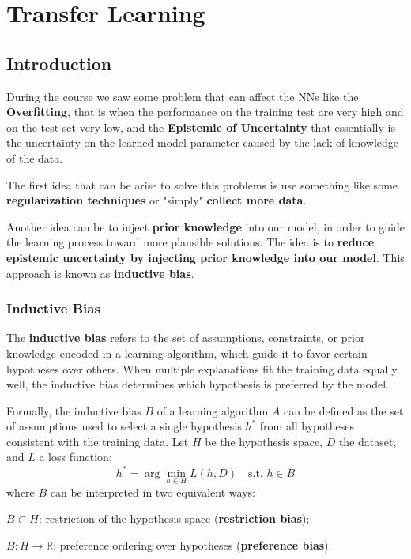 \chapter{Transfer Learning}

\section{Introduction}
During the course we saw some problem that can affect the NNs like the \textbf{Overfitting}, that is when the performance on the training test are very high and on the test set very low, and the \textbf{Epistemic of Uncertainty} that essentially is the uncertainty on the learned model parameter caused by the lack of knowledge of the data.

The first idea that can be arise to solve this problems is use something like some \textbf{regularization techniques} or "simply" \textbf{collect more data}.

Another idea can be to inject \textbf{prior knowledge} into our model, in order to guide the
learning process toward more plausible solutions.  
The idea is to \textbf{reduce epistemic uncertainty by injecting prior knowledge into our model}.
This approach is known as \textbf{inductive bias}.

\subsection{Inductive Bias}
The \textbf{inductive bias} refers to the set of assumptions, constraints, or prior knowledge
encoded in a learning algorithm, which guide it to favor certain hypotheses over others.
When multiple explanations fit the training data equally well, the inductive bias determines
which hypothesis is preferred by the model.

Formally, the inductive bias $B$ of a learning algorithm $A$ can be defined as the set of
assumptions used to select a single hypothesis $h^*$ from all hypotheses consistent with the
training data. Let $H$ be the hypothesis space, $D$ the dataset, and $L$ a loss function:
\[
h^* = \arg\min_{h \in H} L(h, D) \quad \text{s.t. } h \in B
\]
where $B$ can be interpreted in two equivalent ways:
\begin{compactitemize}
    \item $B \subset H$: restriction of the hypothesis space (\textbf{restriction bias});
    \item $B : H \rightarrow \mathbb{R}$: preference ordering over hypotheses (\textbf{preference bias}).
\end{compactitemize}

